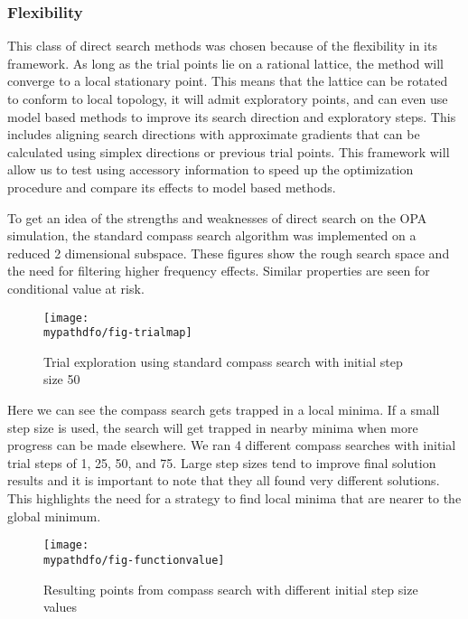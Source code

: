 \subsubsection{Flexibility}
This class of direct search methods was chosen because of the flexibility in its framework.   As long as the trial points lie on a rational lattice, the method will converge to a local stationary point.  This means that the lattice can be rotated to conform to local topology, it will admit exploratory points, and can even use model based methods to improve its search direction and exploratory steps.  This includes aligning search directions with approximate gradients that can be calculated using simplex directions or previous trial points. This framework will allow us to test using accessory information to speed up the optimization procedure and compare its effects to model based methods.



To get an idea of the strengths and weaknesses of direct search on the OPA simulation, the standard compass search algorithm was implemented on a reduced 2 dimensional subspace.  These figures show the rough search space and the need for filtering higher frequency effects.  Similar properties are seen for conditional value at risk.

\begin{figure}
\centering
\texttt{[image: \\mypathdfo/fig-trialmap]}
\caption{Trial exploration using standard compass search with initial step size 50}
\end{figure}


Here we can see the compass search gets trapped in a local minima.  If a small step size is used, the search will get trapped in nearby minima when more progress can be made elsewhere.   We ran 4 different compass searches with initial trial steps of 1, 25, 50, and 75.  Large step sizes tend to improve final solution results and it is important to note that they all found very different solutions. This highlights the need for a strategy to find local minima that are nearer to the global minimum. 


\begin{figure}
\centering
\texttt{[image: \\mypathdfo/fig-functionvalue]}
\caption{Resulting points from compass search with different initial step size values}
\end{figure}











